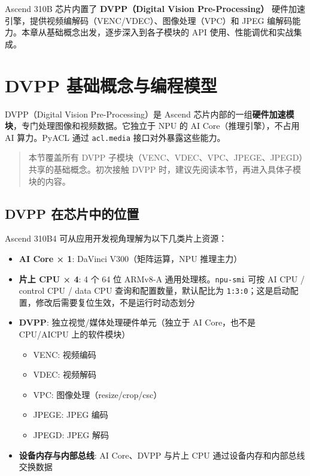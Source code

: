 Ascend 310B 芯片内置了 \textbf{DVPP（Digital Vision Pre-Processing）}
硬件加速引擎，提供视频编解码（VENC/VDEC）、图像处理（VPC）和 JPEG
编解码能力。本章从基础概念出发，逐步深入到各子模块的 API
使用、性能调优和实战集成。

\section{DVPP 基础概念与编程模型}\label{dvpp-basics}

DVPP（Digital Vision Pre-Processing）是 Ascend
芯片内部的一组\textbf{硬件加速模块}，专门处理图像和视频数据。它独立于
NPU 的 AI Core（推理引擎），不占用 AI 算力。PyACL 通过
\passthrough{\lstinline!acl.media!} 接口对外暴露这些能力。

\begin{quote}
本节覆盖所有 DVPP
子模块（VENC、VDEC、VPC、JPEGE、JPEGD）共享的基础概念。初次接触 DVPP
时，建议先阅读本节，再进入具体子模块的内容。
\end{quote}

\subsection{DVPP 在芯片中的位置}\label{src-book-chapter6-h1}

Ascend 310B4 可从应用开发视角理解为以下几类片上资源：

\begin{itemize}
\tightlist
\item
  \textbf{AI Core × 1}: DaVinci V300（矩阵运算，NPU 推理主力）
\item
  \textbf{片上 CPU × 4}: 4 个 64 位 ARMv8-A
  通用处理核。\passthrough{\lstinline!npu-smi!} 可按 AI CPU / control
  CPU / data CPU 查询和配置数量，默认配比为
  \passthrough{\lstinline!1:3:0!}；这是启动配置，修改后需要复位生效，不是运行时动态划分
\item
  \textbf{DVPP}: 独立视觉/媒体处理硬件单元（独立于 AI Core，也不是
  CPU/AICPU 上的软件模块）

  \begin{itemize}
  \tightlist
  \item
    VENC: 视频编码
  \item
    VDEC: 视频解码
  \item
    VPC: 图像处理（resize/crop/csc）
  \item
    JPEGE: JPEG 编码
  \item
    JPEGD: JPEG 解码
  \end{itemize}
\item
  \textbf{设备内存与内部总线}: AI Core、DVPP 与片上 CPU
  通过设备内存和内部总线交换数据
\end{itemize}


